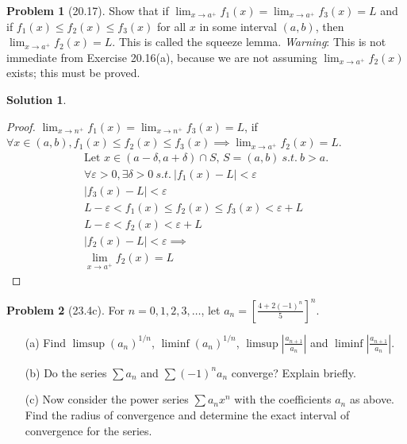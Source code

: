\documentclass[12pt]{article}
\theoremstyle{definition} %
\newtheorem{solution}{Solution}
\newtheorem{problem}{Problem}
\theoremstyle{plain} %
\begin{document}
\begin{problem}[20.17]
    Show that if $ \lim_{x \to a^+} f_1(x) = \lim_{x \to a^+} f_3(x) = L $ and if $ f_1(x) \leq f_2(x) \leq f_3(x) $ for all $ x $ in some interval $ (a, b) $, then $ \lim_{x \to a^+} f_2(x) = L $. This is called the squeeze lemma. \textit{Warning}: This is not immediate from Exercise 20.16(a), because we are not assuming $ \lim_{x \to a^+} f_2(x) $ exists; this must be proved.
\end{problem}
\begin{solution}
    \begin{proof}
        $\lim_{x \to n^{+}} f_1(x)=\lim_{x \to n^{+}}f_{3}(x)=L$, if $\forall x \in (a,b), f_1(x) \leq f_2(x) \leq f_3(x)\implies \lim_{x \to a^{+}} f_2(x)=L$. \begin{align}
           \text{Let } x\in (a-\delta ,a+\delta )\cap S \text{, } S = (a,b) \ s.t. \ b>a. \\[10pt] 
           \forall \varepsilon>0, \exists \delta >0 \ s.t. \ \left\vert f_1(x) - L \right\vert <\varepsilon \\[10pt] 
           \left\vert f_{3}(x) - L  \right\vert < \varepsilon \\[10pt] 
           L-\varepsilon<f_1(x) \leq f_2(x) \leq f_3(x) <\varepsilon+L \\[10pt] 
           L-\varepsilon< f_2(x) < \varepsilon+L \\[10pt] 
           \left\vert f_2(x)-L \right\vert <\varepsilon \implies \\[10pt] 
           \lim_{x \to a^{+}}f_2(x)=L 
        \end{align}  
    \end{proof}
\end{solution}
\begin{problem}[23.4c]
    For $ n = 0, 1, 2, 3, \dots $, let $ a_n = \left[ \frac{4 + 2 (-1)^n}{5} \right]^n $.

\begin{enumerate}
    \item[(a)] Find $ \limsup (a_n)^{1/n} $, $ \liminf (a_n)^{1/n} $, $ \limsup \left| \frac{a_{n+1}}{a_n} \right| $ and $ \liminf \left| \frac{a_{n+1}}{a_n} \right| $.
    \item[(b)] Do the series $ \sum a_n $ and $ \sum (-1)^n a_n $ converge? Explain briefly.
    \item[(c)] Now consider the power series $ \sum a_n x^n $ with the coefficients $ a_n $ as above. Find the radius of convergence and determine the exact interval of convergence for the series.
\end{enumerate}
\end{problem}
\end{document}
